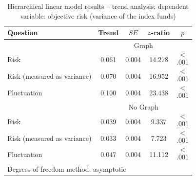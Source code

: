 \documentclass[a4paper,man, natbib,floatsintext]{apa6} %
\begin{document}
\begin{table}[ht!]
\centering
\caption{Hierarchical linear model results -- trend analysis; dependent variable: objective risk (variance of the index funds)} 
\label{tab:study2_hlm_trends}
\begin{tabular}{lcccc}
  \toprule
Question & Trend & $SE$ & $z$-ratio & $p$ \\ 
  \midrule
& \multicolumn{4}{c}{Graph}\\
\cmidrule{2-5}
  Risk & 0.061 & 0.004 & 14.278 & $$<$$.001 \\ 
  Risk (measured as variance) & 0.070 & 0.004 & 16.952 & $$<$$.001 \\
   Fluctuation & 0.100 & 0.004 & 23.438 & $$<$$.001 \\ 
   \midrule
& \multicolumn{4}{c}{No Graph}\\
\cmidrule{2-5} 
  Risk & 0.039 & 0.004  & 9.337 & $$<$$.001 \\ 
    Risk (measured as variance) & 0.033 & 0.004  & 7.723 & $$<$$.001 \\ 
  Fluctuation & 0.047 & 0.004  & 11.112 & $$<$$.001 \\ 
   \bottomrule
\multicolumn{5}{l}{\rule{0em}{2.5ex}{\footnotesize Degrees-of-freedom method: asymptotic}}\\
\end{tabular}
\end{table}
%
\end{document}
